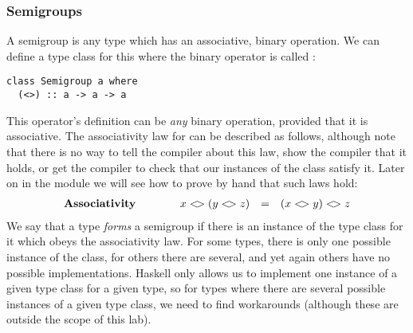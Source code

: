 \subsubsection{Semigroups}

A semigroup is any type which has an associative, binary operation. We can define a type class for this where the binary operator is called \haskellIn{<>}:
\begin{verbatim}
class Semigroup a where 
  (<>) :: a -> a -> a 
\end{verbatim}
This operator's definition can be \emph{any} binary operation, provided that it is associative. The associativity law for \haskellIn{<>} can be described as follows, although note that there is no way to tell the compiler about this law, show the compiler that it holds, or get the compiler to check that our instances of the  class satisfy it. Later on in the module we will see how to prove by hand that such laws hold:
\begin{displaymath}
\begin{array}{lcrcl}
\textbf{Associativity} & \qquad & x <\!> (y <\!> z) & = & (x <\!> y) <\!> z 
\end{array}
\end{displaymath}
We say that a type \emph{forms} a semigroup if there is an instance of the  type class for it which obeys the associativity law. For some types, there is only one possible instance of the  class, for others there are several, and yet again others have no possible implementations. Haskell only allows us to implement one instance of a given type class for a given type, so for types where there are several possible instances of a given type class, we need to find workarounds (although these are outside the scope of this lab).

\taskLine



